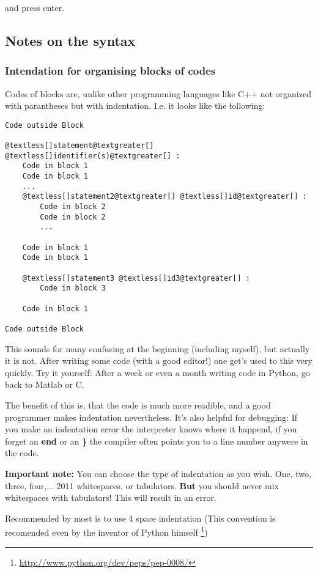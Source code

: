 \documentclass[letterpaper,10pt,english]{manual}
\begin{document}
and press enter.


\subsection{Notes on the syntax}


\hypertarget{indention-ref}{}\subsubsection{Intendation for organising blocks of codes}

Codes of blocks are, unlike other programming languages like C++
not organized with parantheses but with indentation. I.e. it looks
like the following:

\begin{Verbatim}[commandchars=@\[\]]
Code outside Block

@textless[]statement@textgreater[] @textless[]identifier(s)@textgreater[] :
    Code in block 1
    Code in block 1
    ...
    @textless[]statement2@textgreater[] @textless[]id@textgreater[] :
        Code in block 2
        Code in block 2
        ...

    Code in block 1
    Code in block 1

    @textless[]statement3 @textless[]id3@textgreater[] :
        Code in block 3

    Code in block 1

Code outside Block
\end{Verbatim}

This sounds for many confusing at the beginning (including myself),
but actually it is not.
After writing some code (with a good editor!) one get's
used to this very quickly.
Try it yourself: After a week or even a month
writing code in Python, go back to Matlab or C.

The benefit of this is, that the code is much more readible,
and a good programmer makes indentation nevertheless.
It's also helpful for debugging: If you make an indentation error
the interpreter knows where it happend, if you forget an \textbf{end} or
an \textbf{\}} the compiler often points you to a line number anywere in the code.

\textbf{Important note:} You can choose the type of indentation as you wish.
One, two, three, four,... 2011 whitespaces, or tabulators. \textbf{But} you should
never mix whitespaces with tabulators! This will result in an error.

Recommended by most  is to use 4
space indentation (This convention is recomended even by the inventor
of Python himself \footnote{
\href{http://www.python.org/dev/peps/pep-0008/}{http://www.python.org/dev/peps/pep-0008/}
})
\end{document}
